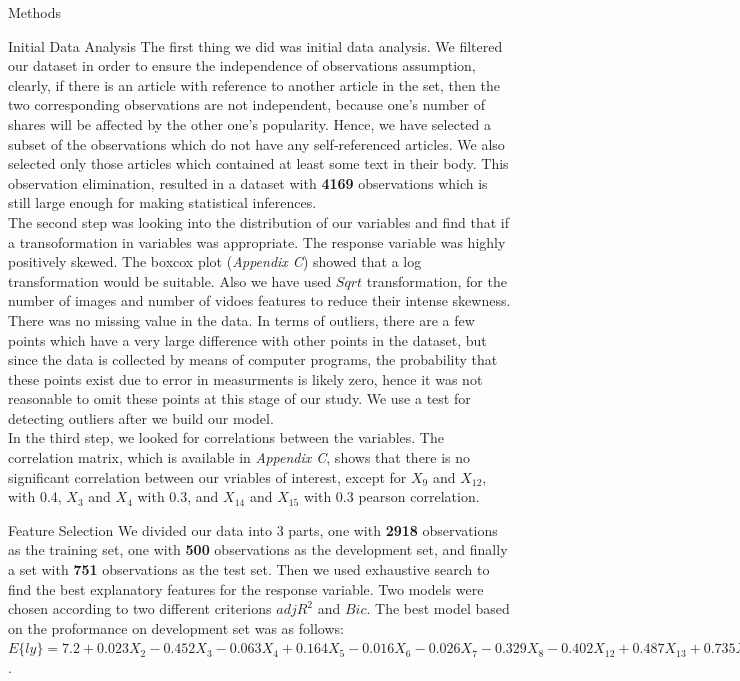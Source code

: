 \documentclass[a4paper,11pt]{article}
\begin{document}
\begin{section}
{Methods}
\begin{subsection}{Initial Data Analysis}
The first thing we did was initial data analysis. We filtered our dataset in order to ensure the independence of observations assumption, clearly, if there is an article with reference to another article in the set, then the two corresponding observations are not independent, because one's number of shares will be affected by the other one's popularity. Hence, we have selected a subset of the observations which do not have any self-referenced articles. We also selected only those articles which contained at least some text in their body. This observation elimination, resulted in a dataset with \textbf{4169} observations which is still large enough for making statistical inferences. \\
The second step was looking into the distribution of our variables and find that if a transoformation in variables was appropriate. The response variable was highly positively skewed. The boxcox plot (\textit{Appendix C}) showed that a log transformation would be suitable. Also we have used $Sqrt$ transformation, for the number of images and number of vidoes features to reduce their intense skewness.\\
There was no missing value in the data. In terms of outliers, there are a few points which have a very large difference with other points in the dataset, but since the data is collected by means of computer programs, the probability that these points exist due to error in measurments is likely zero, hence it was not reasonable to omit these points at this stage of our study. We use a test for detecting outliers after we build our model.\\
In the third step, we looked for correlations between the variables. The correlation matrix, which is available in \textit{Appendix C}, shows that there is no significant correlation between our vriables of interest, except for $X_9$ and $X_{12}$, with 0.4, $X_3$ and $X_4$ with 0.3, and $X_{14}$ and $X_{15}$ with 0.3 pearson correlation.
\end{subsection}

\begin{subsection}{Feature Selection}
We divided our data into 3 parts, one with \textbf{2918} observations as the training set, one with \textbf{500} observations as the development set, and finally a set with \textbf{751} observations as the test set. Then we used exhaustive search to find the best explanatory features for the response variable. Two models were chosen according to two different criterions $adjR^2$ and $Bic$. The best model based on the proformance on development set was as follows:\\
$E\{ly\} = 7.2+0.023X_2-0.452X_3-0.063X_4+0.164X_5-0.016X_6-0.026X_7-0.329X_8-0.402X_{12}+0.487X_{13}+0.735X_{14}$.
\end{subsection}


\end{section}
\end{document}

